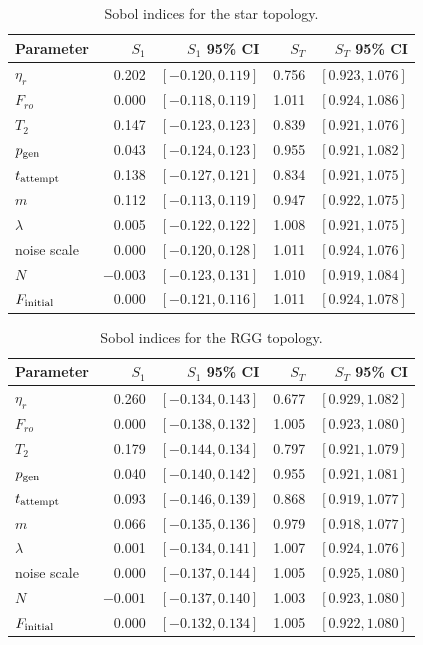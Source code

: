 \documentclass[aps,prapplied,reprint,superscriptaddress]{revtex4-2}
\begin{document}
\begin{table}[htbp]
\centering
\caption{Sobol indices for the star topology.}
\label{tab:sobol_star}
\begin{tabular}{lrrrr}
\toprule
Parameter & $S_1$ & $S_1$ 95\% CI & $S_T$ & $S_T$ 95\% CI \\
\midrule
$\eta_r$ & 0.202 & $[-0.120, 0.119]$ & 0.756 & $[0.923, 1.076]$ \\
$F_{ro}$ & 0.000 & $[-0.118, 0.119]$ & 1.011 & $[0.924, 1.086]$ \\
$T_2$ & 0.147 & $[-0.123, 0.123]$ & 0.839 & $[0.921, 1.076]$ \\
$p_{\rm gen}$ & 0.043 & $[-0.124, 0.123]$ & 0.955 & $[0.921, 1.082]$ \\
$t_{\rm attempt}$ & 0.138 & $[-0.127, 0.121]$ & 0.834 & $[0.921, 1.075]$ \\
$m$ & 0.112 & $[-0.113, 0.119]$ & 0.947 & $[0.922, 1.075]$ \\
$\lambda$ & 0.005 & $[-0.122, 0.122]$ & 1.008 & $[0.921, 1.075]$ \\
noise scale & 0.000 & $[-0.120, 0.128]$ & 1.011 & $[0.924, 1.076]$ \\
$N$ & $-0.003$ & $[-0.123, 0.131]$ & 1.010 & $[0.919, 1.084]$ \\
$F_{\rm initial}$ & 0.000 & $[-0.121, 0.116]$ & 1.011 & $[0.924, 1.078]$ \\
\bottomrule
\end{tabular}
\end{table}

\begin{table}[htbp]
\centering
\caption{Sobol indices for the RGG topology.}
\label{tab:sobol_rgg}
\begin{tabular}{lrrrr}
\toprule
Parameter & $S_1$ & $S_1$ 95\% CI & $S_T$ & $S_T$ 95\% CI \\
\midrule
$\eta_r$ & 0.260 & $[-0.134, 0.143]$ & 0.677 & $[0.929, 1.082]$ \\
$F_{ro}$ & 0.000 & $[-0.138, 0.132]$ & 1.005 & $[0.923, 1.080]$ \\
$T_2$ & 0.179 & $[-0.144, 0.134]$ & 0.797 & $[0.921, 1.079]$ \\
$p_{\rm gen}$ & 0.040 & $[-0.140, 0.142]$ & 0.955 & $[0.921, 1.081]$ \\
$t_{\rm attempt}$ & 0.093 & $[-0.146, 0.139]$ & 0.868 & $[0.919, 1.077]$ \\
$m$ & 0.066 & $[-0.135, 0.136]$ & 0.979 & $[0.918, 1.077]$ \\
$\lambda$ & 0.001 & $[-0.134, 0.141]$ & 1.007 & $[0.924, 1.076]$ \\
noise scale & 0.000 & $[-0.137, 0.144]$ & 1.005 & $[0.925, 1.080]$ \\
$N$ & $-0.001$ & $[-0.137, 0.140]$ & 1.003 & $[0.923, 1.080]$ \\
$F_{\rm initial}$ & 0.000 & $[-0.132, 0.134]$ & 1.005 & $[0.922, 1.080]$ \\
\bottomrule
\end{tabular}
\end{table}
\end{document}
